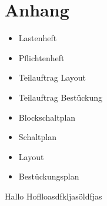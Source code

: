 \section{Anhang}

\begin{itemize}
	\item{Lastenheft}
	
	\item{Pflichtenheft}
	
	\item{Teilauftrag Layout}
	
	\item{Teilauftrag Bestückung}
	
	\item{Blockschaltplan}
	
	\item{Schaltplan}
	
	\item{Layout}
	
	\item{Bestückungsplan}
\end{itemize}


Hallo Hoflloasdfkljasöldfjas